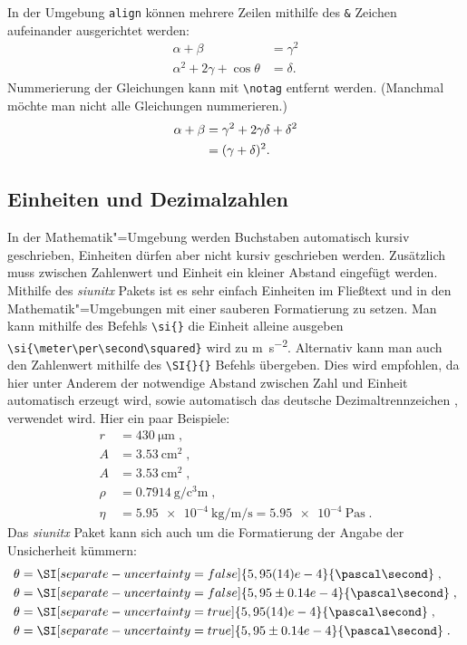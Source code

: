 In der Umgebung \verb"align" können mehrere Zeilen mithilfe des \verb"&" Zeichen aufeinander ausgerichtet werden:
\begin{align}
\alpha + \beta &=\gamma^2 \\
\alpha^2 + 2\gamma + \cos\theta &= \delta.\label{eq:erstesBsp} 
\end{align}
Nummerierung der Gleichungen kann mit \verb|\notag| entfernt werden. (Manchmal möchte man nicht alle Gleichungen nummerieren.)
\begin{align}
\alpha + \beta &=\gamma^2 + 2\gamma\delta + \delta^2 \notag \\
&= (\gamma + \delta)^2.\label{eq:zweitesBsp} 
\end{align}

\subsection{Einheiten und Dezimalzahlen}
\label{sec:Einheiten}
 In der Mathematik"=Umgebung werden Buchstaben automatisch kursiv geschrieben, Einheiten dürfen aber nicht kursiv geschrieben werden. Zusätzlich muss zwischen Zahlenwert und Einheit ein kleiner Abstand eingefügt werden. Mithilfe des \textit{siunitx} Pakets ist es sehr einfach Einheiten im Fließtext und in den Mathematik"=Umgebungen mit einer sauberen Formatierung zu setzen. Man kann mithilfe des Befehls \verb"\si{}" die Einheit alleine ausgeben \verb"\si{\meter\per\second\squared}" wird zu \si{\meter\per\second\squared}. Alternativ kann man auch den Zahlenwert mithilfe des \verb"\SI{}{}" Befehls übergeben. Dies wird empfohlen, da hier unter Anderem der notwendige Abstand zwischen Zahl und Einheit automatisch erzeugt wird, sowie automatisch das deutsche Dezimaltrennzeichen , verwendet wird. Hier ein paar Beispiele:
\begin{align*} \label{eq:einhbsp}
r&=\SI{430}{\micro\meter}\; , \\
A&=\SI{3,53}{\centi\meter\squared}\; , \\
A&=\SI{3.53}{\centi\meter\squared}\; , \\
\rho&=\SI{0,7914}{\gram\per\cubic\centi\meter} \; , \\
\eta&=\SI{5,95e-4}{\kilo\gram\per\meter\per\second} = \SI{5,95e-4}{\pascal\second} \; .
\end{align*}
Das \textit{siunitx} Paket kann sich auch um die Formatierung der Angabe der Unsicherheit kümmern:
\begin{align*}
\theta& =\SI[separate-uncertainty=false]{5,95(14)e-4}{\pascal\second}\; ,\\
\theta& =\SI[separate-uncertainty=false]{5,95\pm0.14 e-4}{\pascal\second}\; ,\\
\theta& =\SI[separate-uncertainty=true]{5,95(14)e-4}{\pascal\second}\; ,\\
\theta& =\SI[separate-uncertainty=true]{5,95\pm0.14 e-4}{\pascal\second}\; .
\end{align*}
